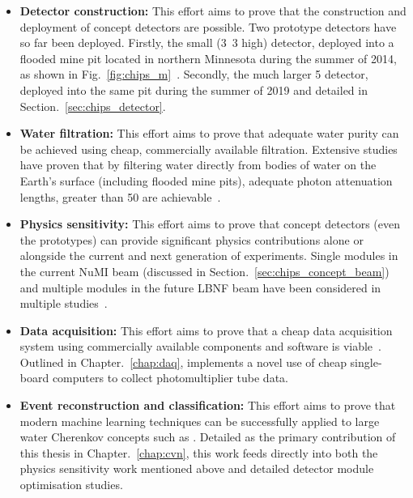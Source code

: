 \begin{itemize}
    \item \textbf{Detector construction:} This effort aims to prove that the construction and
          deployment of \chips concept detectors are possible. Two prototype detectors have so far
          been deployed. Firstly, the small (\unit{3.3}{} high) \chipsm detector,
          deployed into a flooded mine pit located in northern Minnesota during the summer of
          2014, as shown in Fig.~\ref{fig:chips_m}~\cite{perch2015, pfutznerProto2017,
              pfutzner2017}. Secondly, the much larger \unit{5}{} \chipsfive detector,
          deployed into the same pit during the summer of 2019 and detailed in
          Section.~\ref{sec:chips_detector}.

    \item \textbf{Water filtration:} This effort aims to prove that adequate water purity can be
          achieved using cheap, commercially available filtration. Extensive studies have proven
          that by filtering water directly from bodies of water on the Earth's surface (including
          flooded mine pits), adequate photon attenuation lengths, greater than
          \unit{50}{} are achievable~\cite{amat2017, campbell2020}.

    \item \textbf{Physics sensitivity:} This effort aims to prove that \chips concept detectors
          (even the prototypes) can provide significant physics contributions alone or alongside
          the current and next generation of experiments. Single modules in the current NuMI beam
          (discussed in Section.~\ref{sec:chips_concept_beam}) and multiple modules in the future
          LBNF beam have been considered in multiple studies~\cite{pfutzner2017, adde2016,
              lang2015}.

    \item \textbf{Data acquisition:} This effort aims to prove that a cheap data acquisition
          system using commercially available components and software is viable~\cite{eijk2018}.
          Outlined in Chapter.~\ref{chap:daq}, \chips implements a novel use of cheap single-board
          computers to collect photomultiplier tube data.

    \item \textbf{Event reconstruction and classification:} This effort aims to prove that modern
          machine learning techniques can be successfully applied to large water Cherenkov
          concepts such as \chips. Detailed as the primary contribution of this thesis in
          Chapter.~\ref{chap:cvn}, this work feeds directly into both the physics sensitivity work
          mentioned above and detailed detector module optimisation studies.
\end{itemize}

